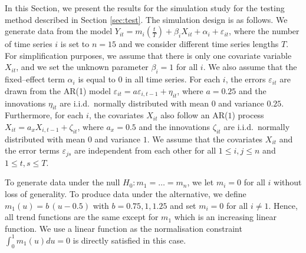 \documentclass[a4paper,12pt]{article}
\begin{document}
In this Section, we present the results for the simulation study for the testing method described in Section \ref{sec:test}. The simulation design is as follows. We generate data from the model $Y_{it} =m_i(\frac{t}{T})  + \beta_i X_{it} +  \alpha_i  + \varepsilon_{it}$, where the number of time series $i$ is set to $n = 15$ and we consider different time series lengths $T$. For simplification purposes, we assume that there is only one covariate variable $X_{it}$, and we set the unknown parameter $\beta_i = 1$ for all $i$. We also assume that the fixed--effect term $\alpha_i$ is equal to $0$ in all time series. For each $i$, the errors $\varepsilon_{it}$ are drawn from the AR(1) model $\varepsilon_{it} = a \varepsilon_{i, t-1} + \eta_{it}$, where $a = 0.25$ and the innovations $\eta_{it}$ are i.i.d.\ normally distributed with mean $0$ and variance $0.25$. Furthermore, for each $i$, the covariates $X_{it}$ also follow an AR($1$) process $X_{it} = a_x X_{i, t-1} + \zeta_{it}$, where $a_x = 0.5$ and the innovations $\zeta_{it}$ are i.i.d.\ normally distributed with mean $0$ and variance $1$. We assume that the covariates $X_{it}$ and the error terms $\varepsilon_{js}$ are independent from each other for all $1 \leq i,j \leq n$ and $1 \leq t, s \leq T$.

To generate data under the null $H_0: m_1 = \ldots = m_n$, we let $m_i = 0$ for all $i$ without loss of generality. To produce data under the alternative, we define $m_1(u) = b \, (u - 0.5) $ with $b = 0.75, 1, 1.25$ and set $m_i = 0$ for all $i \ne 1$. Hence, all trend functions are the same except for $m_1$ which is an increasing linear function. We use a linear function as the normalisation constraint $\int_0^1 m_1(u) du = 0$ is directly satisfied in this case. 
\end{document}
